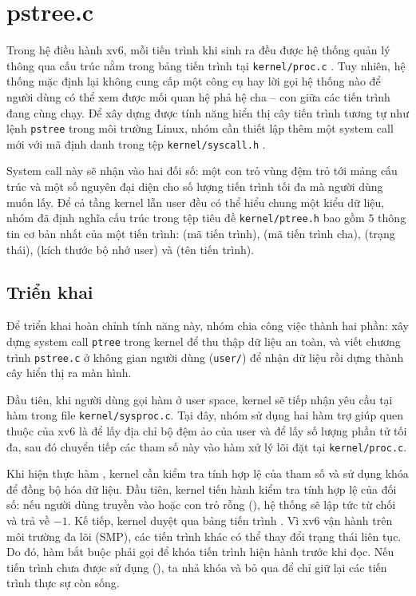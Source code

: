 \section{pstree.c}
Trong hệ điều hành xv6, mỗi tiến trình khi sinh ra đều được hệ thống
quản lý thông qua cấu trúc  nằm trong bảng tiến trình
 tại \texttt{kernel/proc.c} \cite{xv6book}. Tuy nhiên,
hệ thống mặc định lại không cung cấp một công cụ hay lời gọi hệ thống
nào để người dùng có thể xem được mối quan hệ phả hệ cha -- con giữa các
tiến trình đang cùng chạy. Để xây dựng được tính năng hiển thị cây tiến
trình tương tự như lệnh \texttt{pstree} trong môi trường Linux, nhóm
cần thiết lập thêm một system call mới với mã định danh 
trong tệp \texttt{kernel/syscall.h} \cite{hcmus_os_lab2}.

System call này sẽ nhận vào hai đối số: một con trỏ vùng đệm 
trỏ tới mảng cấu trúc và một số nguyên  đại diện cho số lượng
tiến trình tối đa mà người dùng muốn lấy. Để cả tầng kernel lẫn user
đều có thể hiểu chung một kiểu dữ liệu, nhóm đã định nghĩa cấu trúc
 trong tệp tiêu đề \texttt{kernel/ptree.h} bao
gồm $5$ thông tin cơ bản nhất của một tiến trình:  (mã tiến
trình),  (mã tiến trình cha),  (trạng thái),
 (kích thước bộ nhớ user) và  (tên tiến trình).

\subsection{Triển khai}
Để triển khai hoàn chỉnh tính năng này, nhóm chia công việc thành hai
phần: xây dựng system call \texttt{ptree} trong kernel để thu thập dữ
liệu an toàn, và viết chương trình \texttt{pstree.c} ở không gian người
dùng (\texttt{user/}) để nhận dữ liệu rồi dựng thành cây hiển thị ra
màn hình.

Đầu tiên, khi người dùng gọi hàm  ở user
space, kernel sẽ tiếp nhận yêu cầu tại hàm 
trong file \texttt{kernel/sysproc.c}. Tại đây, nhóm sử dụng hai hàm
trợ giúp quen thuộc của xv6 là  để lấy địa
chỉ bộ đệm ảo của user và  để lấy số lượng phần
tử tối đa, sau đó chuyển tiếp các tham số này vào hàm xử lý lõi
 đặt tại \texttt{kernel/proc.c}.

Khi hiện thực hàm , kernel cần kiểm tra tính hợp lệ của tham số
và sử dụng khóa để đồng bộ hóa dữ liệu. Đầu tiên, kernel
tiến hành kiểm tra tính hợp lệ của đối số: nếu người dùng truyền vào
 hoặc con trỏ rỗng (), hệ thống sẽ lập tức
từ chối và trả về $-1$. Kế tiếp, kernel duyệt qua bảng tiến trình
. Vì xv6 vận hành trên môi trường đa lõi (SMP), các tiến
trình khác có thể thay đổi trạng thái liên tục. Do đó, hàm bắt buộc phải gọi
 để khóa tiến trình hiện hành trước khi đọc. Nếu tiến
trình chưa được sử dụng (), ta nhả khóa
 và bỏ qua để chỉ giữ lại các tiến trình thực sự còn sống.

